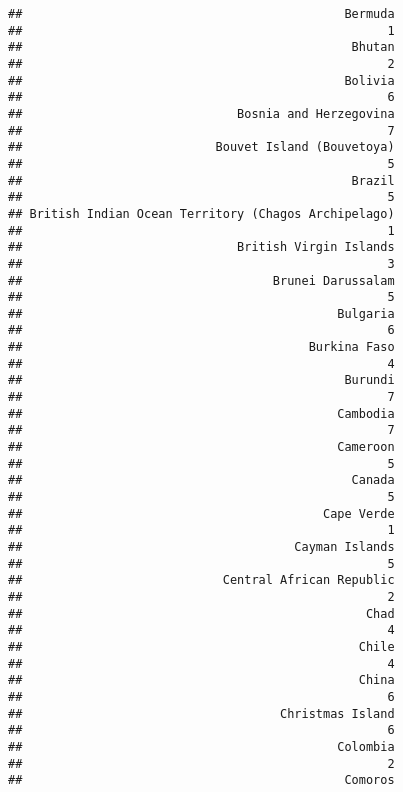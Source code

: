 \documentclass[
]{article}
\begin{document}
\begin{verbatim}
##                                             Bermuda 
##                                                   1 
##                                              Bhutan 
##                                                   2 
##                                             Bolivia 
##                                                   6 
##                              Bosnia and Herzegovina 
##                                                   7 
##                           Bouvet Island (Bouvetoya) 
##                                                   5 
##                                              Brazil 
##                                                   5 
## British Indian Ocean Territory (Chagos Archipelago) 
##                                                   1 
##                              British Virgin Islands 
##                                                   3 
##                                   Brunei Darussalam 
##                                                   5 
##                                            Bulgaria 
##                                                   6 
##                                        Burkina Faso 
##                                                   4 
##                                             Burundi 
##                                                   7 
##                                            Cambodia 
##                                                   7 
##                                            Cameroon 
##                                                   5 
##                                              Canada 
##                                                   5 
##                                          Cape Verde 
##                                                   1 
##                                      Cayman Islands 
##                                                   5 
##                            Central African Republic 
##                                                   2 
##                                                Chad 
##                                                   4 
##                                               Chile 
##                                                   4 
##                                               China 
##                                                   6 
##                                    Christmas Island 
##                                                   6 
##                                            Colombia 
##                                                   2 
##                                             Comoros 

\end{verbatim}
\end{document}
